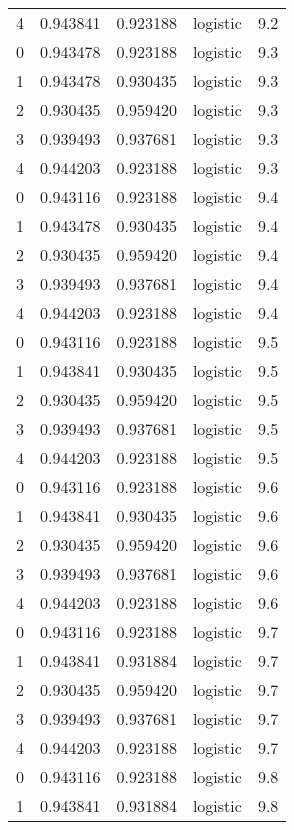\begin{tabular}{rrrlr}
     4 & 0.943841 & 0.923188 & logistic &        9.2 \\
     0 & 0.943478 & 0.923188 & logistic &        9.3 \\
     1 & 0.943478 & 0.930435 & logistic &        9.3 \\
     2 & 0.930435 & 0.959420 & logistic &        9.3 \\
     3 & 0.939493 & 0.937681 & logistic &        9.3 \\
     4 & 0.944203 & 0.923188 & logistic &        9.3 \\
     0 & 0.943116 & 0.923188 & logistic &        9.4 \\
     1 & 0.943478 & 0.930435 & logistic &        9.4 \\
     2 & 0.930435 & 0.959420 & logistic &        9.4 \\
     3 & 0.939493 & 0.937681 & logistic &        9.4 \\
     4 & 0.944203 & 0.923188 & logistic &        9.4 \\
     0 & 0.943116 & 0.923188 & logistic &        9.5 \\
     1 & 0.943841 & 0.930435 & logistic &        9.5 \\
     2 & 0.930435 & 0.959420 & logistic &        9.5 \\
     3 & 0.939493 & 0.937681 & logistic &        9.5 \\
     4 & 0.944203 & 0.923188 & logistic &        9.5 \\
     0 & 0.943116 & 0.923188 & logistic &        9.6 \\
     1 & 0.943841 & 0.930435 & logistic &        9.6 \\
     2 & 0.930435 & 0.959420 & logistic &        9.6 \\
     3 & 0.939493 & 0.937681 & logistic &        9.6 \\
     4 & 0.944203 & 0.923188 & logistic &        9.6 \\
     0 & 0.943116 & 0.923188 & logistic &        9.7 \\
     1 & 0.943841 & 0.931884 & logistic &        9.7 \\
     2 & 0.930435 & 0.959420 & logistic &        9.7 \\
     3 & 0.939493 & 0.937681 & logistic &        9.7 \\
     4 & 0.944203 & 0.923188 & logistic &        9.7 \\
     0 & 0.943116 & 0.923188 & logistic &        9.8 \\
     1 & 0.943841 & 0.931884 & logistic &        9.8 \\

\end{tabular}
